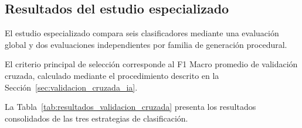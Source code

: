 \subsection{Resultados del estudio especializado}
\label{subsec:desempeno_predictivo}

El estudio especializado compara seis clasificadores mediante una evaluación global y dos evaluaciones independientes por familia de generación procedural.

El criterio principal de selección corresponde al F1 Macro promedio de validación cruzada, calculado mediante el procedimiento descrito en la Sección~\ref{sec:validacion_cruzada_ia}.

La Tabla~\ref{tab:resultados_validacion_cruzada} presenta los resultados consolidados de las tres estrategias de clasificación.

